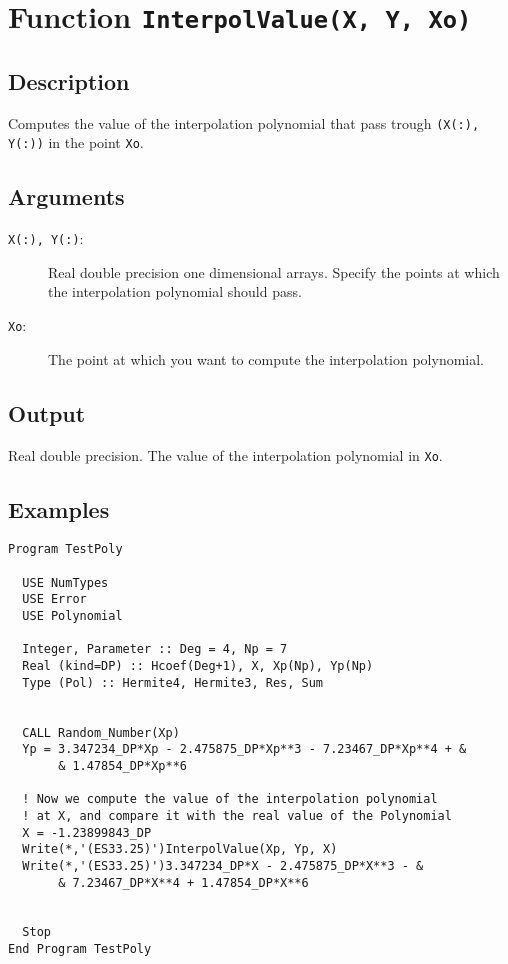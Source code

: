 \section{Function \texttt{InterpolValue(X, Y, Xo)}}

\subsection{Description}

Computes the value of the interpolation polynomial that pass trough
\texttt{(X(:), Y(:))} in the point \texttt{Xo}.

\subsection{Arguments}

\begin{description}
\item[\texttt{X(:), Y(:)}:] Real double precision one dimensional
  arrays. Specify the points at which the interpolation polynomial
  should pass. 
\item[\texttt{Xo}:] The point at which you want to compute the
  interpolation polynomial.
\end{description}

\subsection{Output}

Real double precision. The value of the interpolation polynomial in
\texttt{Xo}. 


\subsection{Examples}

\begin{verbatim}
Program TestPoly

  USE NumTypes
  USE Error
  USE Polynomial

  Integer, Parameter :: Deg = 4, Np = 7
  Real (kind=DP) :: Hcoef(Deg+1), X, Xp(Np), Yp(Np)
  Type (Pol) :: Hermite4, Hermite3, Res, Sum


  CALL Random_Number(Xp)
  Yp = 3.347234_DP*Xp - 2.475875_DP*Xp**3 - 7.23467_DP*Xp**4 + &
       & 1.47854_DP*Xp**6

  ! Now we compute the value of the interpolation polynomial
  ! at X, and compare it with the real value of the Polynomial
  X = -1.23899843_DP
  Write(*,'(ES33.25)')InterpolValue(Xp, Yp, X)
  Write(*,'(ES33.25)')3.347234_DP*X - 2.475875_DP*X**3 - &
       & 7.23467_DP*X**4 + 1.47854_DP*X**6


  Stop
End Program TestPoly
\end{verbatim}

